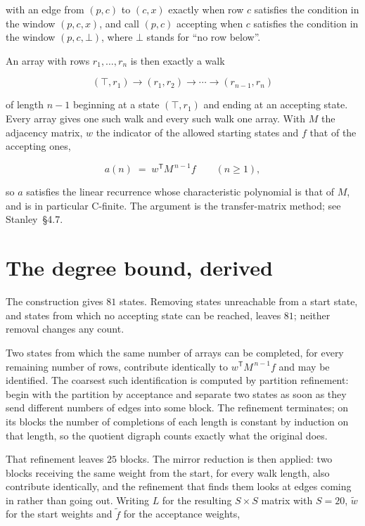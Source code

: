 \documentclass[11pt]{article}
\theoremstyle{definition}
\begin{document}
with an edge from $(p,c)$ to $(c,x)$ exactly when row $c$ satisfies the condition in the window $(p,c,x)$, and call $(p,c)$ accepting when $c$ satisfies the condition in the window $(p,c,\bot)$, where $\bot$ stands for ``no row below''.

An array with rows $r_1,\dots,r_n$ is then exactly a walk

\[(\top,r_1) \to (r_1,r_2) \to \cdots \to (r_{n-1},r_n)\]

of length $n-1$ beginning at a state $(\top,r_1)$ and ending at an accepting state. Every array gives one such walk and every such walk one array. With $M$ the adjacency matrix, $w$ the indicator of the allowed starting states and $f$ that of the accepting ones,

\[a(n) \;=\; w^{\mathsf T} M^{\,n-1} f \qquad (n \ge 1),\]

so $a$ satisfies the linear recurrence whose characteristic polynomial is that of $M$, and is in particular C-finite. The argument is the transfer-matrix method; see Stanley~\S4.7.

\section{The degree bound, derived}

The construction gives $81$ states. Removing states unreachable from a start state, and states from which no accepting state can be reached, leaves $81$; neither removal changes any count.

Two states from which the same number of arrays can be completed, for every remaining number of rows, contribute identically to $w^{\mathsf T}M^{\,n-1}f$ and may be identified. The coarsest such identification is computed by partition refinement: begin with the partition by acceptance and separate two states as soon as they send different numbers of edges into some block. The refinement terminates; on its blocks the number of completions of each length is constant by induction on that length, so the quotient digraph counts exactly what the original does.

That refinement leaves $25$ blocks. The mirror reduction is then applied: two blocks receiving the same weight from the start, for every walk length, also contribute identically, and the refinement that finds them looks at edges coming in rather than going out. Writing $L$ for the resulting $S \times S$ matrix with $S = 20$, $\tilde w$ for the start weights and $\tilde f$ for the acceptance weights,
\end{document}
